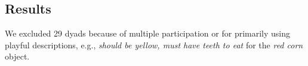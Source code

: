 \documentclass[10pt,letterpaper]{article}
\begin{document}

%
%


\subsection{Results}
We excluded 29 dyads because of multiple participation or for primarily using playful descriptions, e.g., \textit{should be yellow, must have teeth to eat} for the \textit{red corn} object.
\end{document}
